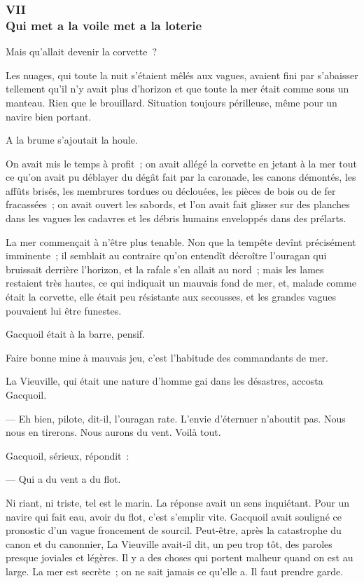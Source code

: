 \documentclass[french,twoside]{book} %
\begin{document}
 \subsubsection[{VII. Qui met a la voile met a la loterie}]{VII \\
Qui met a la voile met a la loterie}
\label{p1l2c7}
\noindent Mais qu’allait devenir la corvette ?\par
Les nuages, qui toute la nuit s’étaient mêlés aux vagues, avaient fini par s’abaisser tellement qu’il n’y avait plus d’horizon et que toute la mer était comme sous un manteau. Rien que le brouillard. Situation toujours périlleuse, même pour un navire bien portant.\par
A la brume s’ajoutait la houle.\par
On avait mis le temps à profit ; on avait allégé la corvette en jetant à la mer tout ce qu’on avait pu déblayer du dégât fait par la caronade, les canons démontés, les affûts brisés, les membrures tordues ou déclouées, les pièces de bois ou de fer fracassées ; on avait ouvert les sabords, et l’on avait fait glisser sur des planches dans les vagues les cadavres et les débris humains enveloppés dans des prélarts.\par
La mer commençait à n’être plus tenable. Non que la tempête devînt précisément imminente ; il semblait au contraire qu’on entendît décroître l’ouragan qui  bruissait derrière l’horizon, et la rafale s’en allait au nord ; mais les lames restaient très hautes, ce qui indiquait un mauvais fond de mer, et, malade comme était la corvette, elle était peu résistante aux secousses, et les grandes vagues pouvaient lui être funestes.\par
Gacquoil était à la barre, pensif.\par
Faire bonne mine à mauvais jeu, c’est l’habitude des commandants de mer.\par
La Vieuville, qui était une nature d’homme gai dans les désastres, accosta Gacquoil.\par
— Eh bien, pilote, dit-il, l’ouragan rate. L’envie d’éternuer n’aboutit pas. Nous nous en tirerons. Nous aurons du vent. Voilà tout.\par
Gacquoil, sérieux, répondit :\par
— Qui a du vent a du flot.\par
Ni riant, ni triste, tel est le marin. La réponse avait un sens inquiétant. Pour un navire qui fait eau, avoir du flot, c’est s’emplir vite. Gacquoil avait souligné ce pronostic d’un vague froncement de sourcil. Peut-être, après la catastrophe du canon et du canonnier, La Vieuville avait-il dit, un peu trop tôt, des paroles presque joviales et légères. Il y a des choses qui portent malheur quand on est au large. La mer est secrète ; on ne sait jamais ce qu’elle a. Il faut prendre garde.\par
\end{document}

